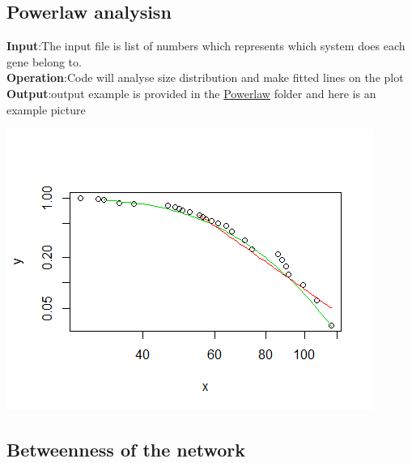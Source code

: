 \documentclass[doublespaced, 12pt]{article}
\begin{document}
\subsection{Powerlaw analysisn}
\textbf{Input}:The input file is list of numbers which represents which system does each gene belong to.\\
\textbf{Operation}:Code will analyse size distribution and make fitted lines on the plot \\
\textbf{Output}:output example is provided in the \underline{Powerlaw} folder and here is an example picture 
\begin{center}
\includegraphics[scale=0.8]{powerlaw}
\end{center}

\subsection{Betweenness of the network}
\end{document}
